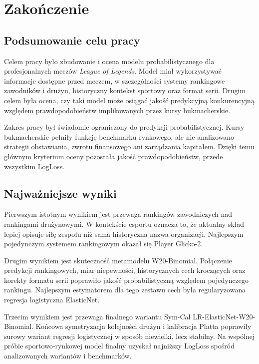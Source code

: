 \chapter{Zakończenie}

\section{Podsumowanie celu pracy}

Celem pracy było zbudowanie i ocena modelu probabilistycznego dla profesjonalnych meczów \textit{League of Legends}. Model miał wykorzystywać informacje dostępne przed meczem, w szczególności systemy rankingowe zawodników i drużyn, historyczny kontekst sportowy oraz format serii. Drugim celem była ocena, czy taki model może osiągać jakość predykcyjną konkurencyjną względem prawdopodobieństw implikowanych przez kursy bukmacherskie.

Zakres pracy był świadomie ograniczony do predykcji probabilistycznej. Kursy bukmacherskie pełniły funkcję benchmarku rynkowego, ale nie analizowano strategii obstawiania, zwrotu finansowego ani zarządzania kapitałem. Dzięki temu głównym kryterium oceny pozostała jakość prawdopodobieństw, przede wszystkim LogLoss.

\section{Najważniejsze wyniki}

Pierwszym istotnym wynikiem jest przewaga rankingów zawodniczych nad rankingami drużynowymi. W kontekście esportu oznacza to, że aktualny skład lepiej opisuje siłę zespołu niż sama historyczna nazwa organizacji. Najlepszym pojedynczym systemem rankingowym okazał się Player Glicko-2.

Drugim wynikiem jest skuteczność metamodelu W20-Binomial. Połączenie predykcji rankingowych, miar niepewności, historycznych cech kroczących oraz korekty formatu serii poprawiło jakość probabilistyczną względem pojedynczego rankingu. Najlepszym estymatorem dla tego zestawu cech była regularyzowana regresja logistyczna ElasticNet.

Trzecim wynikiem jest przewaga finalnego wariantu Sym-Cal LR-ElasticNet-W20-Binomial. Końcowa symetryzacja kolejności drużyn i kalibracja Platta poprawiły surowy wariant regresji logistycznej w sposób niewielki, lecz stabilny. Na wspólnej próbie sportowo-rynkowej model finalny uzyskał najniższy LogLoss spośród analizowanych wariantów i benchmarków.

